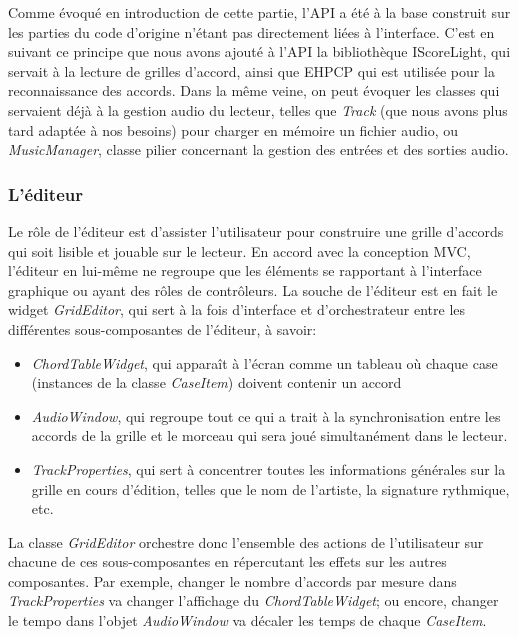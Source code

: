 Comme évoqué en introduction de cette partie, l'\ac{API} a été à la base construit sur les parties du code d'origine n'étant pas directement liées à l'interface. C'est en suivant ce principe que nous avons ajouté à l'\ac{API} la bibliothèque IScoreLight, qui servait à la lecture de grilles d'accord, ainsi que EHPCP qui est utilisée pour la reconnaissance des accords. Dans la même veine, on peut évoquer les classes qui servaient déjà à la gestion audio du lecteur, telles que \textit{Track} (que nous avons plus tard adaptée à nos besoins) pour charger en mémoire un fichier audio, ou \textit{MusicManager}, classe pilier concernant la gestion des entrées et des sorties audio.

\subsubsection{L'éditeur}

Le rôle de l'éditeur est d'assister l'utilisateur pour construire une grille d'accords qui soit lisible et jouable sur le lecteur. En accord avec la conception \ac{MVC}, l'éditeur en lui-même ne regroupe que les éléments se rapportant à l'interface graphique ou ayant des rôles de contrôleurs. La souche de l'éditeur est en fait le widget \textit{GridEditor}, qui sert à la fois d'interface et d'orchestrateur entre les différentes sous-composantes de l'éditeur, à savoir:
\begin{itemize}
 \item \textit{ChordTableWidget}, qui apparaît à l'écran comme un tableau où chaque case (instances de la classe \textit{CaseItem}) doivent contenir un accord
 \item \textit{AudioWindow}, qui regroupe tout ce qui a trait à la synchronisation entre les accords de la grille et le morceau qui sera joué simultanément dans le lecteur.
 \item \textit{TrackProperties}, qui sert à concentrer toutes les informations générales sur la grille en cours d'édition, telles que le nom de l'artiste, la signature rythmique, etc.
\end{itemize}

La classe \textit{GridEditor} orchestre donc l'ensemble des actions de l'utilisateur sur chacune de ces sous-composantes en répercutant les effets sur les autres composantes. Par exemple, changer le nombre d'accords par mesure dans \textit{TrackProperties} va changer l'affichage du \textit{ChordTableWidget}; ou encore, changer le tempo dans l'objet \textit{AudioWindow} va décaler les temps de chaque \textit{CaseItem}.


